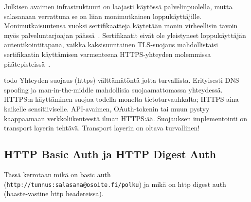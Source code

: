 \documentclass[finnish,gradu]{tktltiki}
\begin{document}
  Julkisen avaimen infrastruktuuri on laajasti käytössä palvelinpuolella, mutta salasanaan verrattuna se on liian monimutkainen loppukäyttäjille. Monimutkaisuutensa vuoksi sertifikaatteja käytetään monin virheellisin tavoin myös palveluntarjoajan päässä~\cite{eff_ssliverse}. Sertifikaatit eivät ole yleistyneet loppukäyttäjän autentikointitapana, vaikka kaksisuuntainen TLS-suojaus mahdollistaisi sertifikaatin käyttämisen varmenteena HTTPS-yhteyden molemmissa päätepisteissä~\cite{henry_story_foaf_ssl, webid_home}.

  todo
  Yhteyden suojaus (https) välttämätöntä jotta turvallista. Erityisesti DNS spoofing ja man-in-the-middle mahdollisia suojaamattomassa yhteydessä.
  HTTPS:n käyttäminen suojaa todella monelta tietoturvauhkalta;
  HTTPS aina kaikelle sensitiiviselle. API-avaimen, OAuth-tokenin tai muun pystyy kaappaamaan verkkoliikenteestä ilman HTTPS:ää.  Suojauksen implementointi on transport layerin tehtävä. Transport layerin on oltava turvallinen!





  \subsection{HTTP Basic Auth ja HTTP Digest Auth} %
  \label{sub:http_basic_auth_ja_http_digest_auth}
  Tässä kerrotaan mikä on basic auth (\verb!http://tunnus:salasana@osoite.fi/polku!) ja mikä on http digest auth (haaste-vastine http headereissa).



\end{document}
